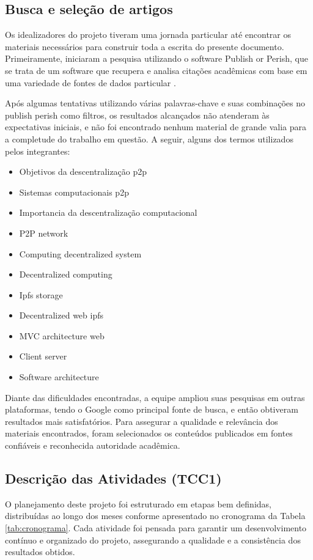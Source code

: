 \subsection{Busca e seleção de artigos}
Os idealizadores do projeto tiveram uma jornada particular até encontrar os materiais necessários para construir toda a escrita do presente documento. Primeiramente, iniciaram a pesquisa utilizando o software Publish or Perish, que se trata de um software que recupera e analisa citações acadêmicas com base em uma variedade de fontes de dados particular \cite{harzing2025publish}.

Após algumas tentativas utilizando várias palavras-chave e suas combinações no publish perish como filtros, os resultados alcançados não atenderam às expectativas iniciais, e não foi encontrado nenhum material de grande valia para a completude do trabalho em questão. A seguir, alguns dos termos utilizados pelos integrantes: 

\begin{itemize}
    \item Objetivos da descentralização p2p
    \item Sistemas computacionais p2p
    \item Importancia da descentralização computacional
    \item P2P network
    \item Computing decentralized system
    \item Decentralized computing
    \item Ipfs storage
    \item Decentralized web ipfs
    \item MVC architecture web
    \item Client server
    \item Software architecture
\end{itemize}

Diante das dificuldades encontradas, a equipe ampliou suas pesquisas em outras plataformas, tendo o Google como principal fonte de busca, e então obtiveram resultados mais satisfatórios. Para assegurar a qualidade e relevância dos materiais encontrados, foram selecionados os conteúdos publicados em fontes confiáveis e reconhecida autoridade acadêmica.

\subsection{Descrição das Atividades (TCC1)}
O planejamento deste projeto foi estruturado em etapas bem definidas, distribuídas ao longo dos meses conforme apresentado no cronograma da Tabela \ref{tab:cronograma}. Cada atividade foi pensada para garantir um desenvolvimento contínuo e organizado do projeto, assegurando a qualidade e a consistência dos resultados obtidos.

